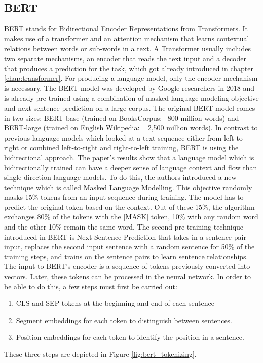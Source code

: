 \subsection{BERT} \label{bert}
BERT  stands  for  Bidirectional Encoder Representations from Transformers. It makes use of a transformer and an attention mechanism that learns contextual relations between words or sub-words in a text. 
A Transformer usually includes two separate mechanisms, an encoder that reads the text input and a decoder that produces a prediction for the task, which got already introduced in chapter \ref{chap:transformer}. For producing a language model, only the encoder mechanism is necessary. The BERT model was developed by Google researchers in 2018 and is already pre-trained using a combination of masked language modeling objective and next sentence prediction on a large corpus. The original BERT model comes in two sizes: BERT-base (trained on BooksCorpus: ~800 million words) and BERT-large (trained on English Wikipedia: ~ 2,500 million words). 
In contrast to previous language models which looked at a text sequence either from left to right or combined left-to-right and right-to-left training, BERT is using the bidirectional approach. The paper’s results show that a language model which is bidirectionally trained can have a deeper sense of language context and flow than single-direction language models. To do this, the authors introduced a new technique which is called Masked Language Modelling. This objective randomly masks 15\% tokens from an input sequence during training. The model has to predict the original token based on the context. Out of these 15\%, the algorithm exchanges 80\% of the tokens with the [MASK] token, 10\% with any random word and the other 10\% remain the same word. The second pre-training technique introduced in BERT is Next Sentence Prediction that takes in a sentence-pair input, replaces the second input sentence with a random sentence for 50\% of the training steps, and trains on the sentence pairs to learn sentence relationships. \newline  
The input to BERT's encoder is a sequence of tokens previously converted into vectors. Later, these tokens can be processed in the neural network. In order to be able to do this, a few steps must first be carried out:
\begin{enumerate}
	\item CLS and SEP tokens at the beginning and end of each sentence
	\item Segment embeddings for each token to distinguish between sentences.
	\item Position embeddings for each token to identify the position in a sentence.
\end{enumerate}
These three steps are depicted in Figure \ref{fig:bert_tokenizing}.

